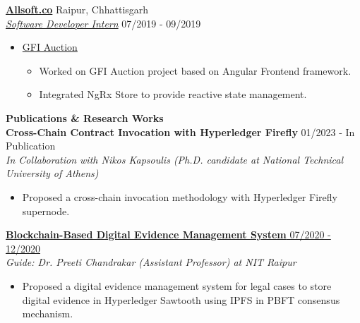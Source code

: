 \documentclass{article}
\begin{document}
\noindent \normalsize \href{https://bit.ly/allsoft_certificate}{\textbf{Allsoft.co}} \hfill Raipur, Chhattisgarh \\
\noindent \normalsize \textit{\href{https://bit.ly/allsoft_certificate}{Software Developer Intern}} \hfill 07/2019 - 09/2019
\begin{itemize}[noitemsep,nolistsep,leftmargin=*]
    \item {\normalsize \href{https://bit.ly/allsoft_certificate}{GFI Auction}
        \begin{itemize}
            \item Worked on GFI Auction project based on Angular Frontend framework.
            \item Integrated NgRx Store to provide reactive state management.
        \end{itemize}
    }
\end{itemize}

\noindent \large \textbf{\textcolor{NavyBlue}{Publications \& Research Works}} \vspace{3pt} \\
\noindent \normalsize \textbf{Cross-Chain Contract Invocation with Hyperledger Firefly} \hfill 01/2023 - In Publication \\
\textit{In Collaboration with Nikos Kapsoulis (Ph.D. candidate at National Technical University of Athens)} \hfill
\begin{itemize}
    \item Proposed a cross-chain invocation methodology with Hyperledger Firefly supernode.
\end{itemize}
\noindent \normalsize \href{https://link.springer.com/content/pdf/10.1007/978-3-030-82469-3_30}{\textbf{Blockchain-Based Digital Evidence Management System } \hfill 07/2020 - 12/2020} \\
\textit{Guide: Dr. Preeti Chandrakar (Assistant Professor) at NIT Raipur} \hfill
\begin{itemize}
    \item Proposed a digital evidence management system for legal cases to store digital evidence in Hyperledger Sawtooth using IPFS in PBFT consensus mechanism.
\end{itemize}
\end{document}
